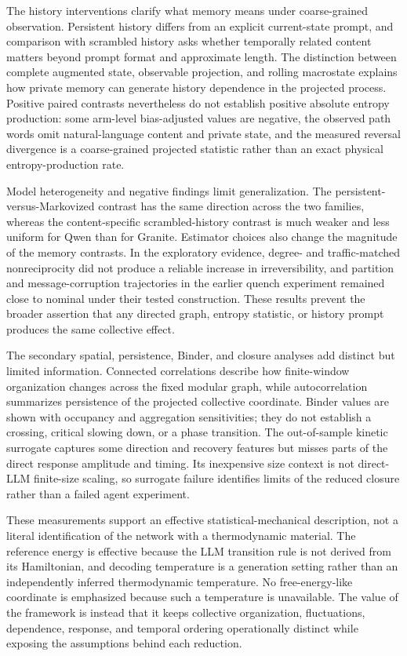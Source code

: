 \documentclass[12pt]{article}
\begin{document}
The history interventions clarify what memory means under coarse-grained
observation.  Persistent history differs from an explicit current-state
prompt, and comparison with scrambled history asks whether temporally related
content matters beyond prompt format and approximate length.  The distinction
between complete augmented state, observable projection, and rolling
macrostate explains how private memory can generate history dependence in the
projected process.  Positive paired contrasts nevertheless do not establish
positive absolute entropy production: some arm-level bias-adjusted values are
negative, the observed path words omit natural-language content and private
state, and the measured reversal divergence is a coarse-grained projected
statistic rather than an exact physical entropy-production rate.

Model heterogeneity and negative findings limit generalization.  The
persistent-versus-Markovized contrast has the same direction across the two
families, whereas the content-specific scrambled-history contrast is much
weaker and less uniform for Qwen than for Granite.  Estimator choices also
change the magnitude of the memory contrasts.  In the exploratory evidence,
degree- and traffic-matched nonreciprocity did not produce a reliable increase
in irreversibility, and partition and message-corruption trajectories in the
earlier quench experiment remained close to nominal under their tested
construction.  These results prevent the broader assertion that any directed
graph, entropy statistic, or history prompt produces the same collective
effect.

The secondary spatial, persistence, Binder, and closure analyses add distinct
but limited information.  Connected correlations describe how finite-window
organization changes across the fixed modular graph, while autocorrelation
summarizes persistence of the projected collective coordinate.  Binder values
are shown with occupancy and aggregation sensitivities; they do not establish
a crossing, critical slowing down, or a phase transition.  The out-of-sample
kinetic surrogate captures some direction and recovery features but misses
parts of the direct response amplitude and timing.  Its inexpensive size
context is not direct-LLM finite-size scaling, so surrogate failure identifies
limits of the reduced closure rather than a failed agent experiment.

These measurements support an effective statistical-mechanical description,
not a literal identification of the network with a thermodynamic material.
The reference energy is effective because the LLM transition rule is not
derived from its Hamiltonian, and decoding temperature is a generation setting
rather than an independently inferred thermodynamic temperature.  No
free-energy-like coordinate is emphasized because such a temperature is
unavailable.  The value of the framework is instead that it keeps collective
organization, fluctuations, dependence, response, and temporal ordering
operationally distinct while exposing the assumptions behind each reduction.
\end{document}
